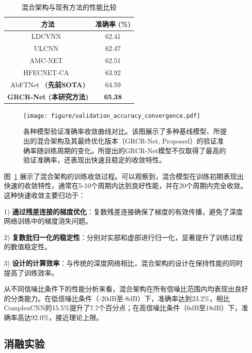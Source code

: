 \documentclass{article}
\begin{document}
\begin{table}[!htbp]
\centering
\caption{混合架构与现有方法的性能比较}
\label{tab:hybrid_performance}
\begin{tabular}{@{}cc@{}}
\toprule
方法 & 准确率 (\%) \\
\midrule
LDCVNN~\cite{xu2025ldcvnn} & 62.41 \\
ULCNN~\cite{guo2024ulcnn} & 62.47 \\
AMC-NET~\cite{zhang2023amcnet} & 62.51 \\
HFECNET-CA~\cite{ma2023hfecnetca} & 63.92 \\
AbFTNet~\cite{ning2024abftnet} \textbf{(先前SOTA)} & 64.59 \\
\textbf{GRCR-Net (本研究方法)} & \textbf{65.38} \\
\bottomrule
\end{tabular}
\end{table}

\begin{figure}[htbp]
\centering
\texttt{[image: figure/validation\_accuracy\_convergence.pdf]}
\caption{各种模型验证准确率收敛曲线对比。该图展示了多种基线模型、所提出的混合架构及其最终优化版本（GRCR-Net, Proposed）的验证准确率随训练周期的变化。所提出的GRCR-Net模型不仅取得了最高的验证准确率，还表现出快速且稳定的收敛特性。}
\label{fig:training_convergence}
\end{figure}

图~\ref{fig:training_convergence} 展示了混合架构的训练收敛过程。可以观察到，混合模型在训练初期表现出快速的收敛特性，通常在5-10个周期内达到良好性能，并在20个周期内完全收敛。这种快速收敛主要归功于：

1) \textbf{通过残差连接的梯度优化}：复数残差连接确保了梯度的有效传播，避免了深度网络训练中的梯度消失问题。

2) \textbf{复数批归一化的稳定性}：分别对实部和虚部进行归一化，显著提升了训练过程的数值稳定性。

3) \textbf{设计的计算效率}：与传统的深度网络相比，混合架构的设计在保持性能的同时提高了训练效率。

从不同信噪比条件下的性能分析来看，混合架构在所有信噪比范围内均表现出良好的分类能力。在低信噪比条件（-20dB至-8dB）下，准确率达到23.2\%，相比ComplexCNN的15.5\%提升了7.7个百分点；在高信噪比条件（6dB至18dB）下，准确率高达92.0\%，接近理论上限。

\subsection{消融实验}
\end{document}
